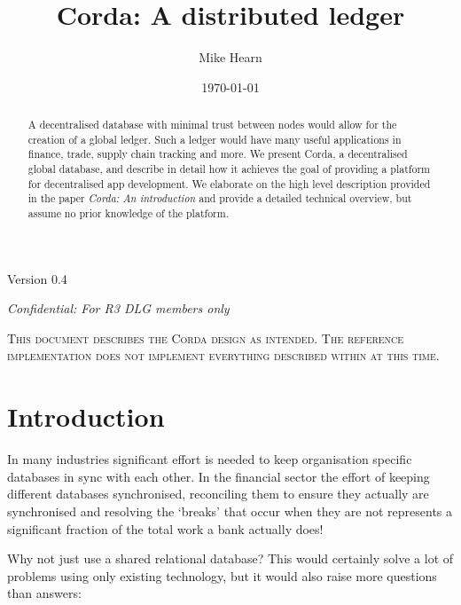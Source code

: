 \documentclass{article}
\author{Mike Hearn}
\date{\today}
\title{Corda: A distributed ledger}
\begin{document}
\maketitle
\begin{center}
Version 0.4

\emph{Confidential: For R3 DLG members only}
\end{center}

\vspace{10mm}

\begin{abstract}

A decentralised database with minimal trust between nodes would allow for the creation of a global ledger. Such a ledger
would have many useful applications in finance, trade, supply chain tracking and more. We present Corda, a decentralised
global database, and describe in detail how it achieves the goal of providing a platform for decentralised app
development. We elaborate on the high level description provided in the paper \emph{Corda: An
introduction}\cite{CordaIntro} and provide a detailed technical overview, but assume no prior knowledge of the platform.

\end{abstract}
\vfill
\begin{center}
\scriptsize{
\textsc{This document describes the Corda design as intended. The reference
implementation does not implement everything described within at this time.}
}
\end{center}
\newpage
\tableofcontents
\newpage
\section{Introduction}

In many industries significant effort is needed to keep organisation specific databases in sync with each
other. In the financial sector the effort of keeping different databases synchronised, reconciling them to ensure
they actually are synchronised and resolving the `breaks' that occur when they are not represents a significant
fraction of the total work a bank actually does!

Why not just use a shared relational database? This would certainly solve a lot of problems using only existing technology,
but it would also raise more questions than answers:
\end{document}
